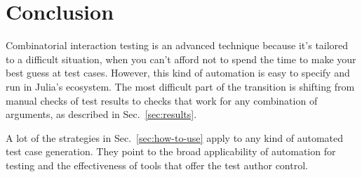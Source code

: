 \documentclass{juliacon}
\begin{document}
\section{Conclusion}
Combinatorial interaction testing is an advanced technique because it's tailored to a difficult situation, when you can't afford not to spend the time to make your best guess at test cases. However, this kind of automation is easy to specify and run in Julia's ecosystem. The most difficult part of the transition is shifting from manual checks of test results to checks that work for any combination of arguments, as described in Sec.~\ref{sec:results}.

A lot of the strategies in Sec.~\ref{sec:how-to-use} apply to any kind of automated test case generation. They point to the broad applicability of automation for testing and the effectiveness of tools that offer the test author control.


\end{document}
